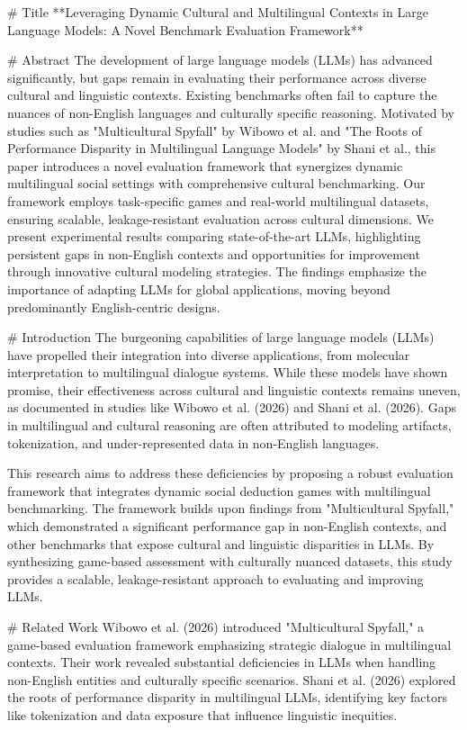 # Title  
**Leveraging Dynamic Cultural and Multilingual Contexts in Large Language Models: A Novel Benchmark Evaluation Framework**

# Abstract  
The development of large language models (LLMs) has advanced significantly, but gaps remain in evaluating their performance across diverse cultural and linguistic contexts. Existing benchmarks often fail to capture the nuances of non-English languages and culturally specific reasoning. Motivated by studies such as "Multicultural Spyfall" by Wibowo et al. and "The Roots of Performance Disparity in Multilingual Language Models" by Shani et al., this paper introduces a novel evaluation framework that synergizes dynamic multilingual social settings with comprehensive cultural benchmarking. Our framework employs task-specific games and real-world multilingual datasets, ensuring scalable, leakage-resistant evaluation across cultural dimensions. We present experimental results comparing state-of-the-art LLMs, highlighting persistent gaps in non-English contexts and opportunities for improvement through innovative cultural modeling strategies. The findings emphasize the importance of adapting LLMs for global applications, moving beyond predominantly English-centric designs.

# Introduction  
The burgeoning capabilities of large language models (LLMs) have propelled their integration into diverse applications, from molecular interpretation to multilingual dialogue systems. While these models have shown promise, their effectiveness across cultural and linguistic contexts remains uneven, as documented in studies like Wibowo et al. (2026) and Shani et al. (2026). Gaps in multilingual and cultural reasoning are often attributed to modeling artifacts, tokenization, and under-represented data in non-English languages.  

This research aims to address these deficiencies by proposing a robust evaluation framework that integrates dynamic social deduction games with multilingual benchmarking. The framework builds upon findings from "Multicultural Spyfall," which demonstrated a significant performance gap in non-English contexts, and other benchmarks that expose cultural and linguistic disparities in LLMs. By synthesizing game-based assessment with culturally nuanced datasets, this study provides a scalable, leakage-resistant approach to evaluating and improving LLMs.

# Related Work  
Wibowo et al. (2026) introduced "Multicultural Spyfall," a game-based evaluation framework emphasizing strategic dialogue in multilingual contexts. Their work revealed substantial deficiencies in LLMs when handling non-English entities and culturally specific scenarios. Shani et al. (2026) explored the roots of performance disparity in multilingual LLMs, identifying key factors like tokenization and data exposure that influence linguistic inequities.  

